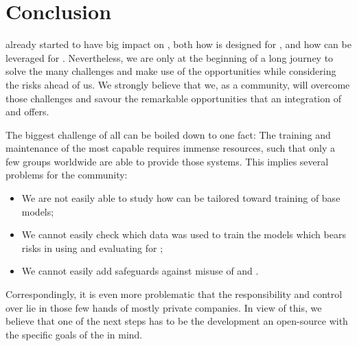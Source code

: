 \section{Conclusion}
\label{llm-sec:conclusion}

\LLMs already started to have big impact on \AutoML, both how \AutoML is designed for \LLMs, and how \LLMs can be leveraged for \AutoML. 
Nevertheless, we are only at the beginning of a long journey to solve the many challenges and make use of the opportunities while considering the risks ahead of us. We strongly believe that we, as a community, will overcome those challenges and savour the remarkable opportunities that an integration of \LLMs and \AutoML offers.

The biggest challenge of all can be boiled down to one fact: The training and maintenance of the most capable \LLMs requires immense resources, such that only a few groups worldwide are able to provide those systems. This implies several problems for the community: \begin{itemize}[(i)]
    \item We are not easily able to study how \AutoML can be tailored toward training of \LLM base models;
    \item We cannot easily check which data was used to train the models which bears risks in using and evaluating \LLMs for \AutoML;
    \item We cannot easily add safeguards against misuse of \LLMs and \AutoML.
\end{itemize}
Correspondingly, it is even more problematic that the responsibility and control over \LLMs lie in those few hands of mostly private companies. In view of this, we believe that one of the next steps has to be the development an open-source \LLM with the specific goals of the \AutoML in mind.
